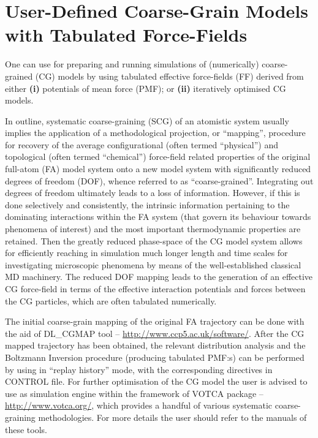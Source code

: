 \section{User-Defined Coarse-Grain Models with Tabulated Force-Fields}
\label{cg-intro}

One can use \D for preparing and running simulations of (numerically) 
coarse-grained (CG) models by using tabulated effective force-fields 
(FF) derived from either {\bf (i)} potentials of mean force (PMF); 
or {\bf (ii)} iteratively optimised CG models. 

In outline, systematic coarse-graining (SCG) of an atomistic system usually 
implies the application of a methodological projection, or ``mapping'', 
procedure for recovery of the average configurational (often termed 
``physical'') and topological (often termed ``chemical'') force-field related 
properties of the original full-atom (FA) model system onto a new model 
system with significantly reduced degrees of freedom (DOF), whence referred 
to as ``coarse-grained''. Integrating out degrees of freedom ultimately 
leads to a loss of information. However, if this is done selectively 
and consistently, the intrinsic information pertaining to the dominating 
interactions within the FA system (that govern its behaviour towards 
phenomena of interest) and the most important thermodynamic properties 
are retained. Then the greatly reduced phase-space of the CG model system 
allows for efficiently reaching in simulation much longer length and time 
scales for investigating microscopic phenomena by means of the well-established 
classical MD machinery. The reduced DOF mapping leads to the generation 
of an effective CG force-field in terms of the effective interaction potentials 
and forces between the CG particles, which are often tabulated numerically.

The initial coarse-grain mapping of the original FA trajectory can be done 
with the aid of DL\_CGMAP tool -- \href{http://www.ccp5.ac.uk/software/}
{http://www.ccp5.ac.uk/software/}. After the CG mapped trajectory 
has been obtained, the relevant distribution analysis and the Boltzmann 
Inversion procedure (producing tabulated PMF:s) can be performed by using \D 
in ``replay history'' mode, with the corresponding directives in CONTROL file.
For further optimisation of the CG model the user is advised to use \D 
as simulation engine within the framework of VOTCA package --
\href{http://www.votca.org/}{http://www.votca.org/}, which 
provides a handful of various systematic coarse-graining methodologies.
For more details the user should refer to the manuals of these tools.

